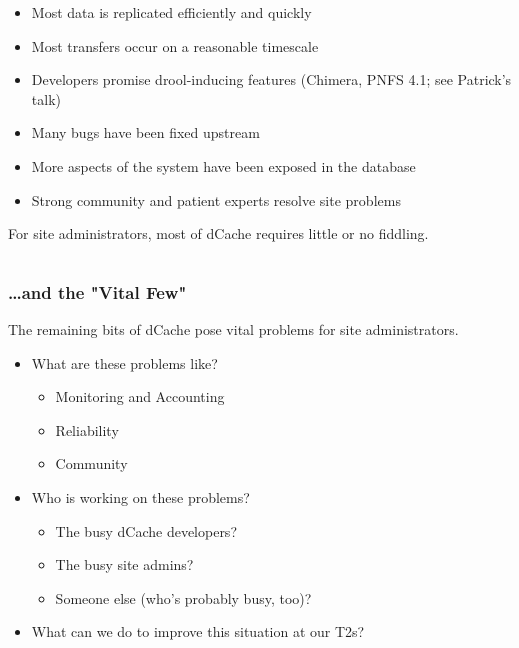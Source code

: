 \documentclass{beamer}
\begin{document}
\begin{frame}
\begin{columns}[t]
\begin{column}{.75\textwidth}
    \begin{itemize}
        \item Most data is replicated efficiently and quickly
        \item Most transfers occur on a reasonable timescale
        \item Developers promise drool-inducing features (Chimera, PNFS 4.1; 
        see Patrick's talk)
        \item Many bugs have been fixed upstream
        \item More aspects of the system have been exposed in the database
        \item Strong community and patient experts resolve site problems
    \end{itemize}
    For site administrators, most of dCache requires little or no fiddling.
\end{column}
\end{columns}
\end{frame}

\begin{frame}
\frametitle{\dots{}and the "Vital Few"}
The remaining bits of dCache pose vital problems for site administrators.

\begin{itemize}
    \item What are these problems like?
    \begin{itemize}
        \item Monitoring and Accounting
        \item Reliability
        \item Community
    \end{itemize}
    \item Who is working on these problems?
    \begin{itemize}
        \item The busy dCache developers?
        \item The busy site admins?
        \item Someone else (who's probably busy, too)?
    \end{itemize}
    \item What can we do to improve this situation at our T2s?
\end{itemize}
\end{frame}

\begin{frame}
\tableofcontents
\end{frame}
\end{document}
